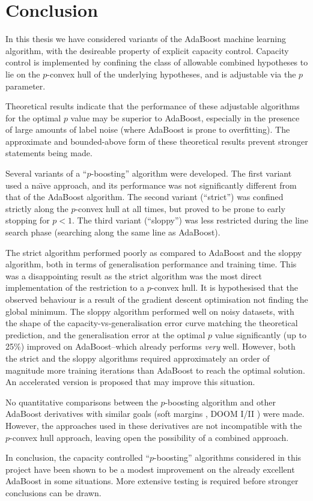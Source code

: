 
\chapter{Conclusion}
\label{chapter:conclusion}

In this thesis we have considered variants of the AdaBoost machine
learning algorithm, with the desireable property of explicit capacity
control.  Capacity control is implemented by confining the class of
allowable combined hypotheses to lie on the $p$-convex hull of the
underlying hypotheses, and is adjustable via the $p$ parameter.

Theoretical results indicate that the performance of these adjustable
algorithms for the optimal $p$ value may be superior to AdaBoost,
especially in the presence of large amounts of label noise (where
AdaBoost is prone to overfitting).  The approximate and bounded-above
form of these theoretical results prevent stronger statements being
made.

Several variants of a ``$p$-boosting'' algorithm were developed.  The
first variant used a na\"{\i}ve approach, and its performance was not
significantly different from that of the AdaBoost algorithm.  The
second variant (``strict'') was confined strictly along the $p$-convex
hull at all times, but proved to be prone to early stopping for $p <
1$.  The third variant (``sloppy'') was less restricted during the
line search phase (searching along the same line as AdaBoost).

The strict algorithm performed poorly as compared to AdaBoost and the
sloppy algorithm, both in terms of generalisation performance and
training time.  This was a disappointing result as the strict
algorithm was the most direct implementation of the restriction to a
$p$-convex hull.  It is hypothesised that the observed behaviour is a 
result of the gradient descent optimisation not finding the global
minimum.  The sloppy algorithm performed well on noisy datasets, with
the shape of the capacity-vs-generalisation error curve matching the
theoretical prediction, and the generalisation error at the optimal
$p$ value significantly (up to 25\%) improved on AdaBoost--which
already performs \emph{very} well.  However, both the strict and the
sloppy algorithms required approximately an order of magnitude more
training iterations than AdaBoost to reach the optimal solution.  An
accelerated version is proposed that may improve this situation.

No quantitative comparisons between the $p$-boosting algorithm and
other AdaBoost derivatives with similar goals (soft margins
\cite{Ratsch98}, DOOM I/II \cite{Mason99, Mason99a}) were made.
However, the approaches used in these derivatives are not incompatible
with the $p$-convex hull approach, leaving open the possibility of a
combined approach.

In conclusion, the capacity controlled ``$p$-boosting'' algorithms
considered in this project have been shown to be a modest improvement
on the already excellent AdaBoost in some situations.  More extensive
testing is required before stronger conclusions can be drawn.
